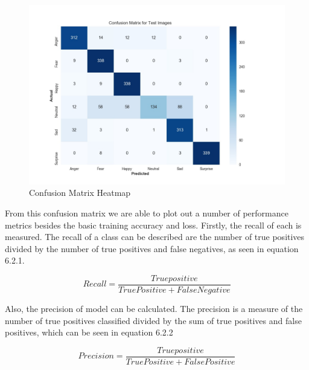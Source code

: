 \begin{figure}[ht]
	\begin{center}
		\advance\leftskip-3cm
		\advance\rightskip-3cm
		\includegraphics[keepaspectratio=true,scale=0.5]{__resources/Results/confusion.jpg}
		\caption{Confusion Matrix Heatmap}
		\label{conf}
	\end{center}
\end{figure}
\newpage

From this confusion matrix we are able to plot out a number of performance metrics besides the basic training accuracy and loss. Firstly, the recall of each is measured. The recall of a class can be described are the number of true positives divided by the number of true positives and false negatives, as seen in equation 6.2.1. 

\begin{equation}\label{eq:recall}
Recall = 
\frac{
True positive
}{
True Positive + False Negative
}
\end{equation}

Also, the precision of model can be calculated. The precision is a measure of the number of true positives classified divided by the sum of true positives and false positives, which can be seen in equation 6.2.2

\begin{equation}\label{eq:recall}
Precision = 
\frac{
	True positive
}{
	True Positive + False Positive
}
\end{equation}

